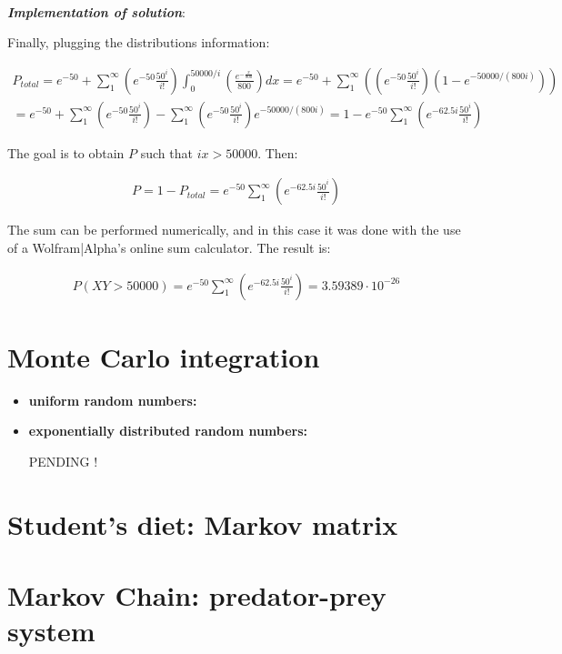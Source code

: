 \documentclass[paper=a4, fontsize=11pt]{scrartcl} %
\numberwithin{equation}{section} %
\numberwithin{figure}{section} %
\numberwithin{table}{section} %
\begin{document}
\ \\
\textit{\textbf{Implementation of solution}}:

Finally, plugging the distributions information:

\begin{equation}
\begin{split}
P_{total} = e^{-50}+\sum_{1}^{\infty} \left( e^{-50}\frac{50^{i}}{i!} \right) \int_{0}^{50000/i}\left( \frac{e^{-\frac{x}{800}}}{800} \right)dx = e^{-50}+\sum_{1}^{\infty} \left( \left( e^{-50}\frac{50^{i}}{i!} \right) \left( 1 - e^{-50000/(800i)} \right) \right) \\
= e^{-50}+\sum_{1}^{\infty} \left( e^{-50}\frac{50^{i}}{i!} \right) - \sum_{1}^{\infty} \left( e^{-50}\frac{50^{i}}{i!} \right) e^{-50000/(800i)}  = 1 - e^{-50}\sum_{1}^{\infty} \left( e^{-62.5i}\frac{50^{i}}{i!} \right)
\end{split}
\label{eq:total_prob4}
\end{equation}


The goal is to obtain $P$ such that $ix>50000$. Then:

\begin{equation}
\begin{split}
P = 1 - P_{total}  = e^{-50}\sum_{1}^{\infty} \left( e^{-62.5i}\frac{50^{i}}{i!} \right)
\end{split}
\label{eq:total_prob4}
\end{equation}

The sum can be performed numerically, and in this case it was done with the use of a Wolfram|Alpha's online sum calculator. The result is:


\begin{equation}
\begin{split}
P (XY>50000) = e^{-50}\sum_{1}^{\infty} \left( e^{-62.5i}\frac{50^{i}}{i!} \right) = 3.59389\cdot 10^{-26}
\end{split}
\label{eq:total_prob4}
\end{equation}



\section{Monte Carlo integration}


\begin{itemize}
\item \textbf{uniform random numbers:} 





\item \textbf{exponentially distributed random numbers:} 


{\color{red} PENDING ! }


\end{itemize}


\section{Student's diet: Markov matrix}




\section{Markov Chain: predator-prey system}
\end{document}
